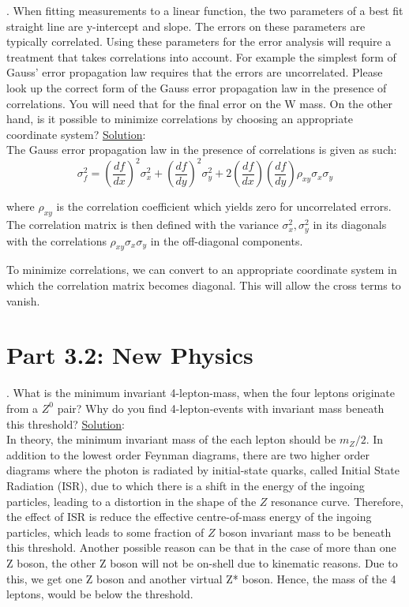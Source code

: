 \documentclass[a4paper]{report}
\numberwithin{equation}{section}
\begin{document}
\bigbreak 

.  When fitting measurements to a linear function, the two parameters of a best fit straight line are y-intercept and slope. The errors on these parameters are typically correlated. Using these parameters for the error analysis will require a treatment that takes correlations into account. For example the simplest form of Gauss’ error propagation law requires that the errors are uncorrelated. Please look up the correct form of the Gauss error propagation law in the presence of correlations. You will need that for the final error on the W mass. On the other hand, is it possible to minimize correlations by choosing an appropriate coordinate system?
\bigbreak
\noindent \underline{Solution}: \\
\noindent The Gauss error propagation law in the presence of correlations is given as such:
$$
	\sigma_f ^2 = \left( \frac{df}{dx} \right)^2 \sigma_x^2 + \left( \frac{df}{dy} \right)^2 \sigma_y^2 + 2 \left( \frac{df}{dx} \right) \left( \frac{df}{dy} \right) \rho_{xy} \sigma_{x} \sigma_y $$
	
\noindent where $\rho_{xy}$ is the correlation coefficient which yields zero for uncorrelated errors. The correlation matrix is then defined with the variance $\sigma_x^2, \sigma_y^2$ in its diagonals with the correlations $\rho_{xy} \sigma_x \sigma_y$ in the off-diagonal components.

\noindent To minimize correlations, we can convert to an appropriate coordinate system in which the correlation matrix becomes diagonal. This will allow the cross terms to vanish.

\section{Part 3.2: New Physics}

. What is the minimum invariant 4-lepton-mass, when the four leptons originate from a $Z^0$ pair? Why do you find 4-lepton-events with invariant mass beneath this threshold?
\bigbreak
\noindent \underline{Solution}: \\
\noindent In theory, the minimum invariant mass of the each lepton should be $m_Z / 2$. In addition to the lowest order Feynman diagrams, there are two higher order diagrams where the photon is radiated by initial-state quarks, called Initial State Radiation (ISR), due to which there is a shift in the energy of the ingoing particles, leading to a distortion in the shape of the $Z$ resonance curve. Therefore, the effect of ISR is reduce the effective centre-of-mass energy of the ingoing particles, which leads to some fraction of $Z$ boson invariant mass to be beneath this threshold. 
Another possible reason can be that in the case of more than one Z boson, the other Z boson will not be on-shell due to kinematic reasons. Due to this, we get one Z boson and another virtual Z* boson. Hence, the mass of the 4 leptons, would be below the threshold. 
\end{document}
